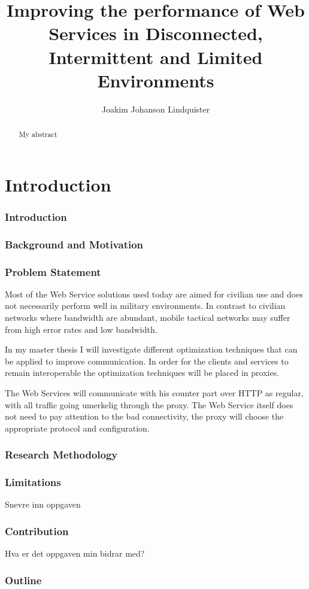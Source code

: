 \documentclass[USenglish]{article}
\title{Improving the performance of Web Services in Disconnected, Intermittent and Limited Environments}
\author{Joakim Johanson Lindquister}
\begin{document}
\ififorside{}

\begin{abstract}
    My abstract
\end{abstract}

\part{Introduction}
\section{Introduction}
\section{Background and Motivation}

\section{Problem Statement}
Most of the Web Service solutions used today are aimed for civilian use and does
not necessarily perform well in military environments. In contrast to civilian
networks where bandwidth are abundant, mobile tactical networks may suffer
from high error rates and low bandwidth.

In my master thesis I will investigate different optimization techniques that
can be applied to improve communication. In order for the clients and services
 to remain interoperable the optimization techniques will be placed in proxies.

The Web Services will communicate with his counter part over HTTP as regular,
with all traffic going umerkelig through the proxy. The Web Service itself does
not need to pay attention to the bad connectivity, the proxy will choose the
appropriate protocol and configuration.

\section{Research Methodology}
\section{Limitations}
Snevre inn oppgaven
\section{Contribution}
Hva er det oppgaven min bidrar med?
\section{Outline}
\end{document}

